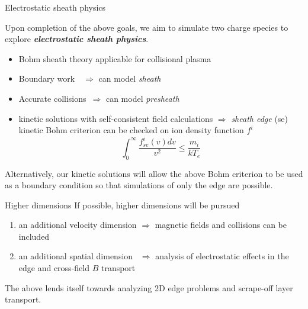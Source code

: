 \documentclass{beamer}
\begin{document}

\begin{frame}{Electrostatic sheath physics}

Upon completion of the above goals, we aim to simulate two charge species to explore \textbf{\emph{electrostatic sheath physics}}.

\begin{itemize}
\item Bohm sheath theory applicable for collisional plasma
\item Boundary work \,\,\,\,\quad\qquad$\Rightarrow$ can model \emph{sheath} 
\item Accurate collisions \,\quad\quad $\Rightarrow$ can model \emph{presheath}
\item kinetic solutions with self-consistent field calculations $\Rightarrow$ \emph{sheath edge} (se) kinetic Bohm criterion can be checked on ion density function $f^i$
$$\int_0^{\infty} \frac{f_{se}^i(v) dv}{v^2} \leq \frac{m_i}{kT_e}$$
\end{itemize}

Alternatively, our kinetic solutions will allow the above Bohm criterion to be used as a boundary condition so that simulations of only the edge are possible.

\end{frame}




\begin{frame}{Higher dimensions}
If possible, higher dimensions will be pursued\\[1em]
\begin{enumerate}
\item an additional velocity dimension $\Rightarrow$ magnetic fields and collisions can be included \\[1em]
\item an additional spatial dimension \,\,\,$\Rightarrow$ analysis of electrostatic effects in the edge and cross-field $B$ transport\\[1em]
\end{enumerate}

The above lends itself towards analyzing 2D edge problems and scrape-off layer transport.

\end{frame}
\end{document}
